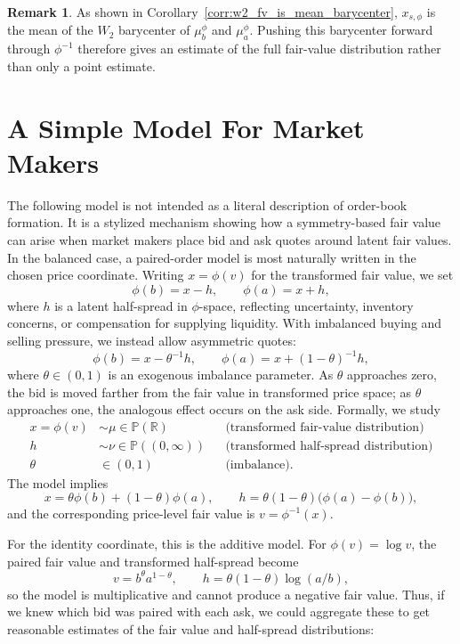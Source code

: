 \documentclass[11pt]{article}
\theoremstyle{plain}
\theoremstyle{definition}
\newtheorem{remark}[theorem]{Remark}
\numberwithin{equation}{section}
\begin{document}
%
\begin{remark}
    As shown in Corollary~\ref{corr:w2_fv_is_mean_barycenter}, $x_{s,\phi}$ is the mean of the $W_2$ barycenter of $\mu_b^\phi$ and $\mu_a^\phi$. Pushing this barycenter forward through $\phi^{-1}$ therefore gives an estimate of the full fair-value distribution rather than only a point estimate.
\end{remark}


\section{A Simple Model For Market Makers}

The following model is not intended as a literal description of order-book
formation. It is a stylized mechanism showing how a symmetry-based fair value
can arise when market makers place bid and ask quotes around latent fair values.
In the balanced case, a paired-order model is most naturally written in the
chosen price coordinate. Writing $x=\phi(v)$ for the transformed fair value, we set
%
\[\phi(b)=x-h, \qquad \phi(a)=x+h,\]
%
where $h$ is a latent half-spread in $\phi$-space, reflecting uncertainty,
inventory concerns, or compensation for supplying liquidity. With imbalanced
buying and selling pressure, we instead allow asymmetric quotes:
%
\[\phi(b)=x-\theta^{-1}h, \qquad
  \phi(a)=x+(1-\theta)^{-1}h,\]
%
where $\theta\in(0,1)$ is an exogenous imbalance parameter. As $\theta$
approaches zero, the bid is moved farther from the fair value in transformed
price space; as $\theta$ approaches one, the analogous effect occurs on the ask
side. Formally, we study
%
\begin{align*}
    x=\phi(v) &\sim \mu \in \mathbb{P}(\mathbb{R})  && \text{(transformed fair-value distribution)} \\
    h &\sim \nu \in \mathbb{P}((0,\infty)) && \text{(transformed half-spread distribution)} \\
    \theta &\in (0,1) && \text{(imbalance)}.
\end{align*}
%
\noindent The model implies
%
\[x=\theta\phi(b)+(1-\theta)\phi(a), \qquad
  h=\theta(1-\theta)\bigl(\phi(a)-\phi(b)\bigr),\]
%
\noindent and the corresponding price-level fair value is $v=\phi^{-1}(x)$.

For the identity coordinate, this is the additive model. For $\phi(v)=\log v$,
the paired fair value and transformed half-spread become
%
\[v=b^\theta a^{1-\theta}, \qquad
h=\theta(1-\theta)\log(a/b),\]
%
\noindent so the model is multiplicative and cannot produce a negative fair value.
%
 Thus, if we knew which bid was paired with each ask, we could aggregate
 these to get reasonable estimates of the fair value and half-spread
 distributions:
\end{document}

